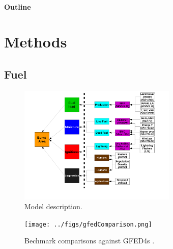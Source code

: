 \documentclass[12pt]{article}
\begin{document}
\paragraph{Outline}

\section{Methods}

\subsection{Fuel}




\begin{figure}[!ht]
  \centering
    \includegraphics[width=0.67\textwidth]{Model_schematic.pdf}

  \caption{Model description.}
\end{figure}

\begin{figure}[!ht]
  \centering
    \texttt{[image: ../figs/gfedComparison.png]}

  \caption{Bechmark comparisons against GFED4s \citep{Giglio2013}.}
\end{figure}
\end{document}
